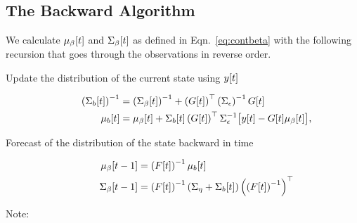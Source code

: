 \subsection{The Backward Algorithm}

We calculate ${\mu_\beta}{[t]}$ and ${\Sigma_\beta}{[t]}$ as defined
in Eqn.~\eqref{eq:contbeta} with the following recursion that goes
through the observations in reverse order.

\begin{description}
\item[Update the distribution of the current state using ${y}{[t]}$]
  \begin{subequations}
    \label{eq:BUpdate}
    \begin{align}
    \left({\Sigma_b}{[t]} \right)^{-1} &= \left({\Sigma_\beta}{[t]}
    \right)^{-1} + \left( {G}{[t]} \right)^\top
    \left(\Sigma_\epsilon
    \right)^{-1} {G}{[t]} \\
        {\mu_b}{[t]} &= {\mu_\beta}{[t]} + {\Sigma_{b}}{[t]}
        \left( {G}{[t]} \right)^\top \Sigma_\epsilon^{-1}
        \big[{y}{[t]} - {G}{[t]} {\mu_\beta}{[t]}\big],
  \end{align}
  \end{subequations}
\item[Forecast of the distribution of the state backward in time]
  \begin{subequations}
    \label{eq:BFore}
    \begin{align}
      {\mu_\beta}{[t-1]} &= \left( {F}{[t]} \right)^{-1}
      {\mu_b}{[t]} \\
      \label{eq:SigmaBeta}
      {\Sigma_\beta}{[t-1]} &= \left( {F}{[t]} \right)^{-1} \left(
        \Sigma_\eta + {\Sigma_b}{[t]} \right) \left( \left( {F}{[t]}
        \right)^{-1} \right)^\top
    \end{align}
  \end{subequations}
\end{description}
Note:
